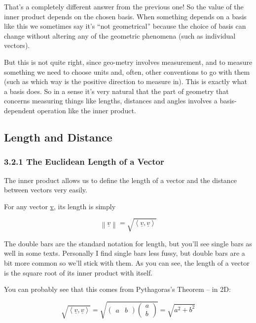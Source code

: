 \documentclass[oneside,english]{amsbook}
\numberwithin{section}{chapter}
\theoremstyle{plain}
\theoremstyle{definition}
\begin{document}
That's a completely different answer from the previous one! So the value
of the inner product depends on the chosen basis. When something depends
on a basis like this we sometimes say it's ``not geometrical'' because
the choice of basis can change without altering any of the geometric
phenomena (such as individual vectors).

But this is not quite right, since geo-metry involves measurement, and
to measure something we need to choose units and, often, other
conventions to go with them (such as which way is the positive direction
to measure in). This is exactly what a basis does. So in a sense it's
very natural that the part of geometry that concerns measuring things
like lengths, distances and angles involves a basis-dependent operation
like the inner product.

\subsection{Length and Distance}\label{length-and-distance}

\subsubsection{3.2.1 The Euclidean Length of a
	Vector}\label{the-euclidean-length-of-a-vector}

The inner product allows us to define the length of a vector and the
distance between vectors very easily.

For any vector \ul{v}, its length is simply

\[\left\| \underline{v} \right\| = \sqrt{\left\langle \underline{v},\underline{v} \right\rangle}\]

The double bars are the standard notation for length, but you'll see
single bars as well in some texts. Personally I find single bars less
fussy, but double bars are a bit more common so we'll stick with them.
As you can see, the length of a vector is the square root of its inner
product with itself.

You can probably see that this comes from Pythagoras's Theorem -- in 2D:

\[\sqrt{\left\langle \underline{v},\underline{v} \right\rangle} = \sqrt{\begin{pmatrix}
		a & b
	\end{pmatrix}\begin{pmatrix}
		a \\
		b
\end{pmatrix}} = \sqrt{a^{2} + b^{2}}\]
\end{document}
